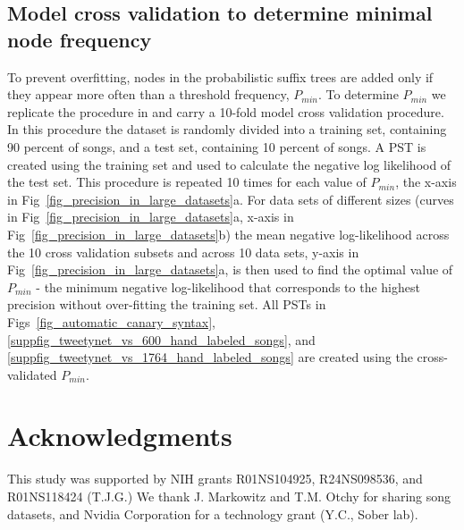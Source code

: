 \documentclass[10pt,letterpaper]{article}
\begin{document}
\subsection*{Model cross validation to determine minimal node frequency}
To prevent overfitting, nodes in the probabilistic suffix trees are added only if they appear more often than a threshold frequency, $P_{min}$. To determine $P_{min}$ we replicate the procedure in \cite{markowitz_long-range_2013} and carry a 10-fold model cross validation procedure. In this procedure the dataset is randomly divided into a training set, containing 90 percent of songs, and a test set, containing 10 percent of songs. A PST is created using the training set and used to calculate the negative log likelihood of the test set. This procedure is repeated 10 times for each value of $P_{min}$, the x-axis in Fig~\ref{fig_precision_in_large_datasets}a. For data sets of different sizes (curves in Fig~\ref{fig_precision_in_large_datasets}a, x-axis in Fig~\ref{fig_precision_in_large_datasets}b) the mean negative log-likelihood across the 10 cross validation subsets and across 10 data sets, y-axis in Fig~\ref{fig_precision_in_large_datasets}a, is then used to find the optimal value of $P_{min}$ - the minimum negative log-likelihood that corresponds to the highest precision without over-fitting the training set. All PSTs in Figs~\ref{fig_automatic_canary_syntax},\ref{suppfig_tweetynet_vs_600_hand_labeled_songs}, and \ref{suppfig_tweetynet_vs_1764_hand_labeled_songs} are created using the cross-validated $P_{min}$.

\section*{Acknowledgments}
This study was supported by NIH grants R01NS104925,
R24NS098536, and R01NS118424 (T.J.G.) We thank J. Markowitz and T.M. Otchy for sharing song datasets, and Nvidia Corporation for a technology grant (Y.C., Sober lab).
\end{document}
